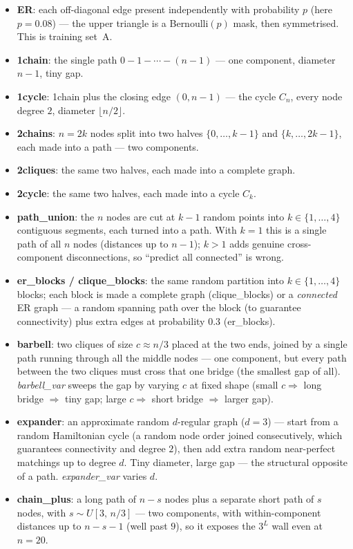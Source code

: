 \documentclass[11pt,a4paper]{article}
\begin{document}
\begin{itemize}\setlength\itemsep{0.15em}
  \item \textbf{ER}: each off-diagonal edge present independently with probability $p$
        (here $p=0.08$) --- the upper triangle is a Bernoulli$(p)$ mask, then symmetrised.
        This is training set~A.
  \item \textbf{1chain}: the single path $0\!-\!1\!-\!\cdots\!-\!(n{-}1)$ --- one component,
        diameter $n{-}1$, tiny gap.
  \item \textbf{1cycle}: 1chain plus the closing edge $(0,n{-}1)$ --- the cycle $C_n$, every
        node degree $2$, diameter $\lfloor n/2\rfloor$.
  \item \textbf{2chains}: $n=2k$ nodes split into two halves $\{0,\dots,k{-}1\}$ and
        $\{k,\dots,2k{-}1\}$, each made into a path --- two components.
  \item \textbf{2cliques}: the same two halves, each made into a complete graph.
  \item \textbf{2cycle}: the same two halves, each made into a cycle $C_k$.
  \item \textbf{path\_union}: the $n$ nodes are cut at $k{-}1$ random points into
        $k\in\{1,\dots,4\}$ contiguous segments, each turned into a path. With $k=1$ this is
        a single path of all $n$ nodes (distances up to $n{-}1$); $k>1$ adds genuine
        cross-component disconnections, so ``predict all connected'' is wrong.
  \item \textbf{er\_blocks / clique\_blocks}: the same random partition into
        $k\in\{1,\dots,4\}$ blocks; each block is made a complete graph (clique\_blocks) or a
        \emph{connected} ER graph --- a random spanning path over the block (to guarantee
        connectivity) plus extra edges at probability $0.3$ (er\_blocks).
  \item \textbf{barbell}: two cliques of size $c\approx n/3$ placed at the two ends, joined
        by a single path running through all the middle nodes --- one component, but every
        path between the two cliques must cross that one bridge (the smallest gap of all).
        \emph{barbell\_var} sweeps the gap by varying $c$ at fixed shape (small $c
        \Rightarrow$ long bridge $\Rightarrow$ tiny gap; large $c \Rightarrow$ short bridge
        $\Rightarrow$ larger gap).
  \item \textbf{expander}: an approximate random $d$-regular graph ($d=3$) --- start from a
        random Hamiltonian cycle (a random node order joined consecutively, which guarantees
        connectivity and degree $2$), then add extra random near-perfect matchings up to
        degree $d$. Tiny diameter, large gap --- the structural opposite of a path.
        \emph{expander\_var} varies $d$.
  \item \textbf{chain\_plus}: a long path of $n{-}s$ nodes plus a separate short path of $s$
        nodes, with $s\sim U[3,\,n/3]$ --- two components, with within-component distances up
        to $n{-}s{-}1$ (well past $9$), so it exposes the $3^L$ wall even at $n=20$.
\end{itemize}
\end{document}
